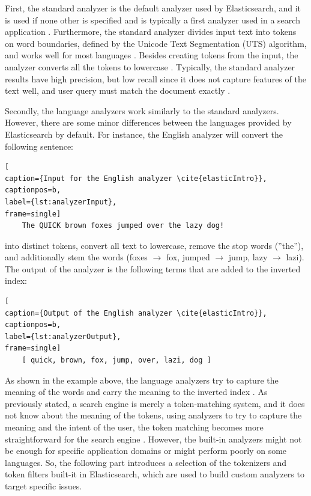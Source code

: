 First, the standard analyzer is the default analyzer used by Elasticsearch, and it is used if none other 
is specified and is typically a first analyzer used in a search application \cite{elasticIntro, relevantSearch}.
Furthermore, the standard analyzer divides input text into tokens on word boundaries, defined
by the Unicode Text Segmentation (UTS) algorithm, and works well for most languages \cite{elasticIntro}.
Besides creating tokens from the input, the analyzer converts all the tokens to lowercase \cite{elasticIntro}.
Typically, the standard analyzer results have high precision, but low recall
since it does not capture features of the text well, and user query must match the document exactly
\cite{relevantSearch}.

Secondly, the language analyzers work similarly to the standard analyzers. 
However, there are some minor differences between the languages 
provided by Elasticsearch by default.
For instance, the English analyzer will convert the following sentence:
\begin{lstlisting}[
caption={Input for the English analyzer \cite{elasticIntro}},
captionpos=b,
label={lst:analyzerInput},
frame=single]
    The QUICK brown foxes jumped over the lazy dog!
\end{lstlisting}
into distinct tokens, convert all text to lowercase, remove the stop words (''the''), and
additionally stem the words (foxes $\rightarrow$ fox, jumped $\rightarrow$ jump, lazy $\rightarrow$ lazi).
The output of the analyzer is the following terms that are added to the inverted index:
\cite{elasticIntro}
\begin{lstlisting}[
caption={Output of the English analyzer \cite{elasticIntro}},
captionpos=b,
label={lst:analyzerOutput},
frame=single]
    [ quick, brown, fox, jump, over, lazi, dog ]
\end{lstlisting}

As shown in the example above, the language analyzers try to capture the meaning of the words and 
carry the meaning to the inverted index \cite{relevantSearch}.
As previously stated, a search engine is merely a token-matching system, and it does not know 
about the meaning of the tokens, using analyzers to try to capture the meaning and 
the intent of the user, the token matching becomes more straightforward for the search engine 
\cite{relevantSearch}.
However, the built-in analyzers might not be enough for specific application domains
or might perform poorly on some languages.
So, the following part introduces a selection of the tokenizers and token filters built-it in
Elasticsearch, which are used to build custom analyzers to target specific issues.


